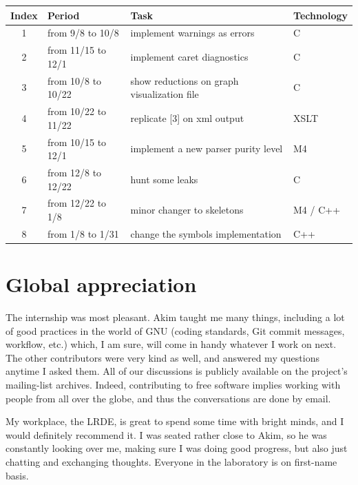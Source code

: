 \documentclass[a4paper,11pt,final]{article}
\begin{document}
  \begin{adjustwidth}{-2cm}{-2cm}
    \begin{center}
      \begin{tabular}{| c | l | l | l |}
        \hline
        Index & Period & Task & Technology \\
        \hline
        1 & from 9/8 to 10/8 & implement warnings as errors & C \\
        2 & from 11/15 to 12/1 & implement caret diagnostics & C \\
        3 & from 10/8 to 10/22 & show reductions on graph visualization file &
        C \\
        4 & from 10/22 to 11/22 & replicate [3] on xml output & XSLT \\
        5 & from 10/15 to 12/1 & implement a new parser purity level & M4 \\
        6 & from 12/8 to 12/22 & hunt some leaks & C \\
        7 & from 12/22 to 1/8 & minor changer to skeletons & M4 / C++ \\
        8 & from 1/8 to 1/31 & change the symbols implementation & C++ \\
        \hline
      \end{tabular}
    \end{center}
  \end{adjustwidth}

  \section*{Global appreciation}

  The internship was most pleasant. Akim taught me many things, including a lot
  of good practices in the world of GNU (coding standards, Git commit messages,
  workflow, etc.) which, I am sure, will come in handy whatever I work on next.
  The other contributors were very kind as well, and answered my questions
  anytime I asked them. All of our discussions is publicly available on the
  project's mailing-list archives. Indeed, contributing to free software
  implies working with people from all over the globe, and thus the
  conversations are done by email.

  My workplace, the LRDE, is great to spend some time with bright minds, and I
  would definitely recommend it. I was seated rather close to Akim, so he was
  constantly looking over me, making sure I was doing good progress, but also
  just chatting and exchanging thoughts. Everyone in the laboratory is on
  first-name basis.
\end{document}
